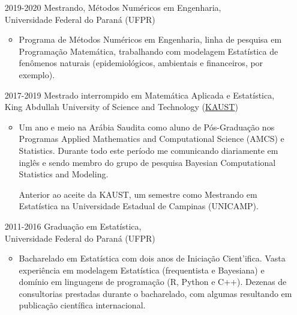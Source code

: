 \documentclass[12pt]{article}
\begin{document}
\begin{itemize}
 \item[2019-2020] Mestrando, M\'{e}todos Num\'{e}ricos em Engenharia,\\
                  Universidade Federal do Paran\'{a} (UFPR)
  \begin{itemize}
   \item Programa de M\'{e}todos Num\'{e}ricos em Engenharia, linha de
         pesquisa em Programa\c{c}\~{a}o Matem\'{a}tica, trabalhando com
         modelagem Estat\'{i}stica de fen\^{o}menos naturais
         (epidemiol\'{o}gicos, ambientais e financeiros, por exemplo).
  \end{itemize}

 \item[2017-2019] Mestrado interrompido em Matem\'{a}tica Aplicada e
                  Estat\'{i}stica,\\
                  King Abdullah University of Science and Technology
                  (\href{https://kaust.edu.sa/en}{\color{blue}KAUST})
  \begin{itemize}
   \item Um ano e meio na Ar\'{a}bia Saudita como aluno de
         P\'{o}s-Gradua\c{c}\~{a}o nos Programas Applied Mathematics and
         Computational Science (AMCS) e Statistics. Durante todo este
         per\'{i}odo me comunicando diariamente em ingl\^{e}s e sendo
         membro do grupo de pesquisa Bayesian Computational Statistics
         and Modeling.

         Anterior ao aceite da KAUST, um semestre como Mestrando em
         Estat\'{i}stica na Universidade Estadual de Campinas (UNICAMP).
  \end{itemize}

 \item[2011-2016] Gradua\c{c}\~{a}o em Estat\'{i}stica,\\
                  Universidade Federal do Paran\'{a} (UFPR)
  \begin{itemize}
   \item Bacharelado em Estat\'{i}stica com dois anos de Inicia\c{c}\~{a}o
         Cient'{i}fica. Vasta experi\^{e}ncia em modelagem Estat\'{i}stica
         (frequentista e Bayesiana) e dom\'{i}nio em linguagens de
         programa\c{c}\~{a}o (R, Python e C++). Dezenas de  consultorias
         prestadas durante o bacharelado, com algumas resultando em
         publica\c{c}\~{a}o cient\'{i}fica internacional.
  \end{itemize}
\end{itemize}
\end{document}
